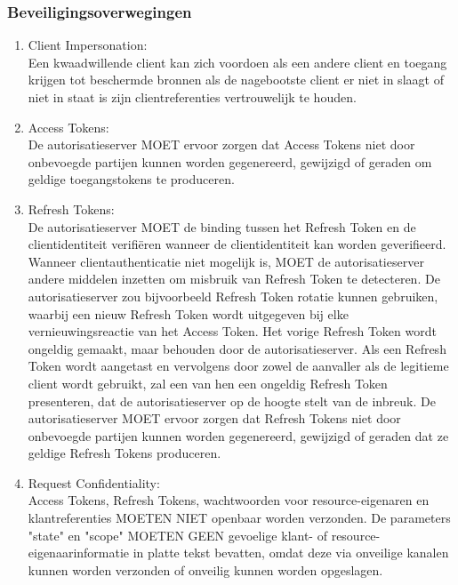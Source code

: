 \subsubsection{Beveiligingsoverwegingen}
\label{subsubsec:beveiligingsoverwegingen}
\begin{enumerate}[label=\textbf{-}]
    \item Client Impersonation: \\
    Een kwaadwillende client kan zich voordoen als een andere client en toegang krijgen tot beschermde bronnen als de nagebootste client er niet in slaagt of niet in staat is zijn clientreferenties vertrouwelijk te houden.

    \item Access Tokens: \\
    De autorisatieserver MOET ervoor zorgen dat Access Tokens niet door onbevoegde partijen kunnen worden gegenereerd, gewijzigd of geraden om geldige toegangstokens te produceren.

    \item Refresh Tokens: \\
    De autorisatieserver MOET de binding tussen het Refresh Token en de clientidentiteit verifiëren wanneer de clientidentiteit kan worden geverifieerd. Wanneer clientauthenticatie niet mogelijk is, MOET de autorisatieserver andere middelen inzetten om misbruik van Refresh Token te detecteren. De autorisatieserver zou bijvoorbeeld Refresh Token rotatie kunnen gebruiken, waarbij een nieuw Refresh Token wordt uitgegeven bij elke vernieuwingsreactie van het Access Token. Het vorige Refresh Token wordt ongeldig gemaakt, maar behouden door de autorisatieserver. Als een Refresh Token wordt aangetast en vervolgens door zowel de aanvaller als de legitieme client wordt gebruikt, zal een van hen een ongeldig Refresh Token presenteren, dat de autorisatieserver op de hoogte stelt van de inbreuk. De autorisatieserver MOET ervoor zorgen dat Refresh Tokens niet door onbevoegde partijen kunnen worden gegenereerd, gewijzigd of geraden dat ze geldige Refresh Tokens produceren.

    \item Request Confidentiality: \\
    Access Tokens, Refresh Tokens, wachtwoorden voor resource-eigenaren en klantreferenties MOETEN NIET openbaar worden verzonden. De parameters "state" en "scope" MOETEN GEEN gevoelige klant- of resource-eigenaarinformatie in platte tekst bevatten, omdat deze via onveilige kanalen kunnen worden verzonden of onveilig kunnen worden opgeslagen.
\end{enumerate}


